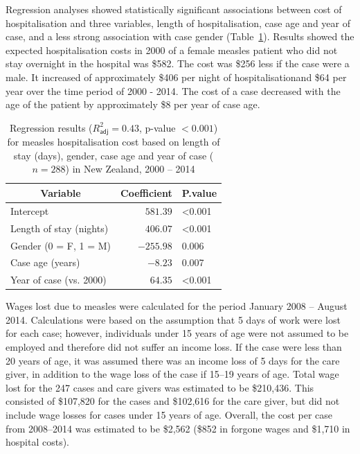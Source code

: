\documentclass{article}
\begin{document}
Regression analyses showed statistically significant associations between cost of hospitalisation and three variables, length of hospitalisation, case age and year of case, and a less strong association with case gender (Table~\ref{table:regression}). Results showed the expected hospitalisation costs in 2000 of a female measles patient who did not stay overnight in the hospital was \$582.  The cost was \$256 less if the case were a male. It increased of approximately \$406 per night of hospitalisationand \$64 per year over the time period of 2000 - 2014. The cost of a case decreased with the age of the patient by approximately \$8 per year of case age.


\begin{table}
\caption{Regression results ($R^{2}_\textsf{adj} = 0.43$, p-value $<0.001$) for measles hospitalisation cost based on length of stay (days), gender, case age and year of case ($n=288$) in New Zealand, 2000 -- 2014}
\begin{center}
\begin{tabular}{lrl}
\hline\hline
\multicolumn{1}{c}{Variable}&\multicolumn{1}{c}{Coefficient}&\multicolumn{1}{c}{P.value}\tabularnewline
\hline
Intercept&$ 581.39$&\textless  0.001\tabularnewline
Length of stay (nights)&$ 406.07$&\textless  0.001\tabularnewline
Gender (0 = F, 1 = M)&$-255.98$&0.006\tabularnewline
Case age (years)&$  -8.23$&0.007\tabularnewline
Year of case (vs. 2000)&$  64.35$&\textless  0.001\tabularnewline
\hline
\end{tabular}\end{center}\label{table:regression}
\end{table}

Wages lost due to measles were calculated for the period January 2008 -- August 2014. Calculations were based on the assumption that 5 days of work were lost for each case; however, individuals under 15 years of age were not assumed to be employed and therefore did not suffer an income loss. If the case were less than 20 years of age, it was assumed there was an income loss of 5 days for the care giver, in addition to the wage loss of the case if 15--19 years of age. Total wage lost for the 247 cases and care givers was estimated to be \$210,436. This consisted of \$107,820 for the cases and \$102,616 for the care giver, but did not include wage losses for cases under 15 years of age. Overall, the cost per case from 2008--2014 was estimated to be \$2,562 (\$852 in forgone wages and \$1,710 in hospital costs).
\end{document}
